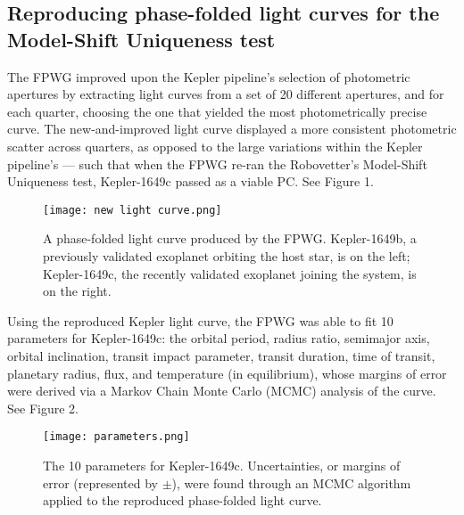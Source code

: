 \documentclass[onecolumn, 12pt]{article}
\begin{document}
\subsection{Reproducing phase-folded light curves for the Model-Shift Uniqueness test}

The FPWG improved upon the Kepler pipeline's selection of photometric apertures by extracting light curves from a set of 20 different apertures, and for each quarter, choosing the one that yielded the most photometrically precise curve. The new-and-improved light curve displayed a more consistent photometric scatter across quarters, as opposed to the large variations within the Kepler pipeline's — such that when the FPWG re-ran the Robovetter's Model-Shift Uniqueness test, Kepler-1649c passed as a viable PC. See Figure 1.

\begin{figure}[p]
\centering
\texttt{[image: new light curve.png]}
\caption{A phase-folded light curve produced by the FPWG. Kepler-1649b, a previously validated exoplanet orbiting the host star, is on the left; Kepler-1649c, the recently validated exoplanet joining the system, is on the right.}
\end{figure}

Using the reproduced Kepler light curve, the FPWG was able to fit 10 parameters for Kepler-1649c: the orbital period, radius ratio, semimajor axis, orbital inclination, transit impact parameter, transit duration, time of transit, planetary radius, flux, and temperature (in equilibrium), whose margins of error were derived via a Markov Chain Monte Carlo (MCMC) analysis of the curve. See Figure 2.

\begin{figure}[p]
\centering
\texttt{[image: parameters.png]}
\caption{The 10 parameters for Kepler-1649c. Uncertainties, or margins of error (represented by $\pm$), were found through an MCMC algorithm applied to the reproduced phase-folded light curve.}
\end{figure}
\end{document}
